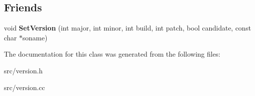 \subsection*{Friends}
\begin{DoxyCompactItemize}
\item 
\hypertarget{classv8_1_1internal_1_1_version_a8cf6f34703ea4ad8ddf5df52abec6592}{}void {\bfseries Set\+Version} (int major, int minor, int build, int patch, bool candidate, const char $\ast$soname)\label{classv8_1_1internal_1_1_version_a8cf6f34703ea4ad8ddf5df52abec6592}

\end{DoxyCompactItemize}


The documentation for this class was generated from the following files\+:\begin{DoxyCompactItemize}
\item 
src/version.\+h\item 
src/version.\+cc\end{DoxyCompactItemize}

